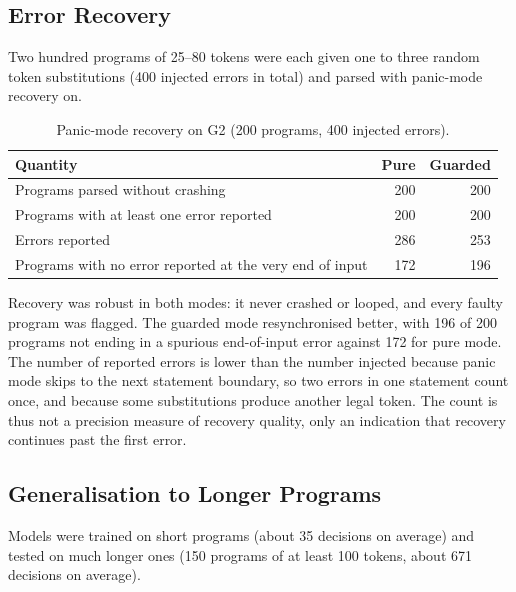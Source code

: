 \documentclass[12pt,a4paper]{article}
\begin{document}
\subsection{Error Recovery}

Two hundred programs of 25--80 tokens were each given one to three random
token substitutions (400 injected errors in total) and parsed with panic-mode
recovery on.

\begin{table}[H]
\centering
\caption{Panic-mode recovery on G2 (200 programs, 400 injected errors).}
\label{tab:rec}
\begin{tabular}{lrr}
\toprule
\textbf{Quantity} & \textbf{Pure} & \textbf{Guarded}\\
\midrule
Programs parsed without crashing & 200 & 200\\
Programs with at least one error reported & 200 & 200\\
Errors reported & 286 & 253\\
Programs with no error reported at the very end of input & 172 & 196\\
\bottomrule
\end{tabular}
\end{table}

Recovery was robust in both modes: it never crashed or looped, and every faulty
program was flagged. The guarded mode resynchronised better, with 196 of 200
programs not ending in a spurious end-of-input error against 172 for pure mode.
The number of reported errors is lower than the number injected because panic
mode skips to the next statement boundary, so two errors in one statement count
once, and because some substitutions produce another legal token. The count is
thus not a precision measure of recovery quality, only an indication that
recovery continues past the first error.

\subsection{Generalisation to Longer Programs}

Models were trained on short programs (about 35 decisions on average) and tested
on much longer ones (150 programs of at least 100 tokens, about 671 decisions on
average).

\begin{table}[H]
\centering
\caption{Training on short programs and testing on long ones (G2).}
\label{tab:len}
\end{table}
\end{document}
